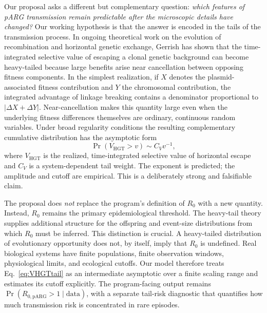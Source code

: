 \documentclass[12pt,a4paper]{article}
\newcommand{\RpARG}{R_{0,\mathrm{pARG}}}
\newcommand{\VHGT}{V_{\mathrm{HGT}}}
\newcommand{\Prob}{\Pr}
\begin{document}
Our proposal asks a different but complementary question: \emph{which features of pARG transmission remain predictable after the microscopic details have changed?} Our working hypothesis is that the answer is encoded in the tails of the transmission process. In ongoing theoretical work on the evolution of recombination and horizontal genetic exchange, Gerrish has shown that the time-integrated selective value of escaping a clonal genetic background can become heavy-tailed because large benefits arise near cancellation between opposing fitness components. In the simplest realization, if $X$ denotes the plasmid-associated fitness contribution and $Y$ the chromosomal contribution, the integrated advantage of linkage breaking contains a denominator proportional to $|\Delta X+\Delta Y|$. Near-cancellation makes this quantity large even when the underlying fitness differences themselves are ordinary, continuous random variables. Under broad regularity conditions the resulting complementary cumulative distribution has the asymptotic form
\begin{equation}
\Prob(\VHGT>v)\sim C_V v^{-1},
\label{eq:VHGTtail}
\end{equation}
where $\VHGT$ is the realized, time-integrated selective value of horizontal escape and $C_V$ is a system-dependent tail weight. The exponent is predicted; the amplitude and cutoff are empirical. This is a deliberately strong and falsifiable claim.

The proposal does \emph{not} replace the program's definition of $R_0$ with a new quantity. Instead, $R_0$ remains the primary epidemiological threshold. The heavy-tail theory supplies additional structure for the offspring and event-size distributions from which $R_0$ must be inferred. This distinction is crucial. A heavy-tailed distribution of evolutionary opportunity does not, by itself, imply that $R_0$ is undefined. Real biological systems have finite populations, finite observation windows, physiological limits, and ecological cutoffs. Our model therefore treats Eq.~\eqref{eq:VHGTtail} as an intermediate asymptotic over a finite scaling range and estimates its cutoff explicitly. The program-facing output remains $\Prob(\RpARG>1\mid\mathrm{data})$, with a separate tail-risk diagnostic that quantifies how much transmission risk is concentrated in rare episodes.
\end{document}
